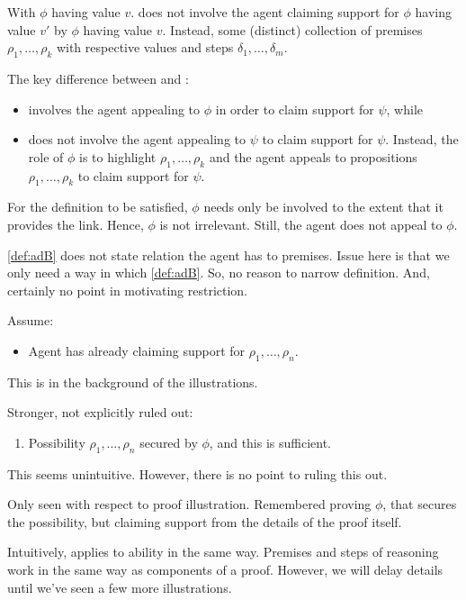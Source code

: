 \begin{note}
  With \adA{} \(\phi\) having value \(v\).
  \adB{} does not involve the agent claiming support for \(\phi\) having value \(v'\) by \(\phi\) having value \(v\).
  Instead, some (distinct) collection of premises \(\rho_{1},\dots,\rho_{k}\) with respective values and steps \(\delta_{1},\dots,\delta_{m}\).

  The key difference between \adA{} and \adB{}:
  \begin{itemize}
  \item \adA{} involves the agent appealing to \(\phi\) in order to claim support for \(\psi\), while
  \item \adB{} does not involve the agent appealing to \(\psi\) to claim support for \(\psi\).
    Instead, the role of \(\phi\) is to highlight \(\rho_{1},\dots,\rho_{k}\) and the agent appeals to propositions \(\rho_{1},\dots,\rho_{k}\) to claim support for \(\psi\).
  \end{itemize}

  For the definition to be satisfied, \(\phi\) needs only be involved to the extent that it provides the link.
  Hence, \(\phi\) is not irrelevant.
  Still, the agent does not appeal to \(\phi\).
\end{note}

\begin{note}
  \autoref{def:adB} does not state relation the agent has to premises.
  Issue here is that we only need a way in which \autoref{def:adB}.
  So, no reason to narrow definition.
  And, certainly no point in motivating restriction.

  Assume:
  \begin{itemize}
  \item Agent has already claiming support for \(\rho_{1},\dots,\rho_{n}\).
  \end{itemize}

  This is in the background of the illustrations.

  Stronger, not explicitly ruled out:

  \begin{enumerate}
  \item Possibility \(\rho_{1},\dots,\rho_{n}\) secured by \(\phi\), and this is sufficient.
  \end{enumerate}

  This seems unintuitive.
  However, there is no point to ruling this out.
\end{note}

\begin{note}
  Only seen \adB{} with respect to proof illustration.
  Remembered proving \(\phi\), that secures the possibility, but claiming support from the details of the proof itself.

  Intuitively, applies to ability in the same way.
  Premises and steps of reasoning work in the same way as components of a proof.
  However, we will delay details until we've seen a few more illustrations.
\end{note}

